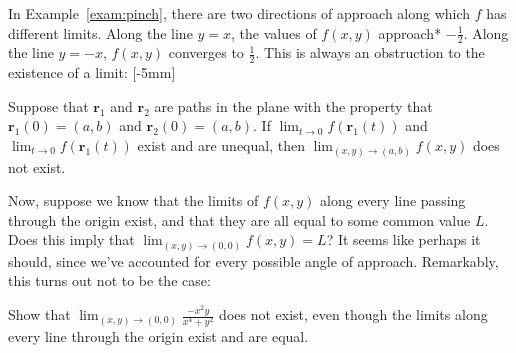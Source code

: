 \documentclass[svgnames]{report}
\begin{document}
In Example~\ref{exam:pinch}, there are two directions of approach
along which $f$ has different limits. Along the line $y = x$, the
values of $f(x,y)$ approach* $-\tfrac{1}{2}$. Along the line $y = -x$,
$f(x,y)$ converges to $\tfrac{1}{2}$. This is always an obstruction to
the existence of a limit: [-5mm]

\begin{exercise}{}{}
  Suppose that $\mathbf{r}_1$ and $\mathbf{r}_2$ are paths in the
  plane with the property that $\mathbf{r}_1(0) = (a,b)$ and
  $\mathbf{r}_2(0) = (a,b)$. If $\lim_{t \to 0}f(\mathbf{r}_1(t))$ and
  $\lim_{t \to 0}f(\mathbf{r}_1(t))$ exist and are unequal, then
  $\displaystyle{\lim_{(x,y) \to (a,b)} f(x,y)}$ does not exist. 
\end{exercise}

Now, suppose we know that the limits of $f(x,y)$ along every line
passing through the origin exist, and that they are all equal to some
common value $L$. Does
this imply that $\lim_{(x,y) \to (0,0)}f(x,y) = L$? It seems like
perhaps it should, since we've accounted for every possible angle of
approach. Remarkably, this turns out not to be the case:

\begin{example}{}{}
  Show that $\lim_{(x,y) \to (0,0)}\frac{-x^2 y }{x^4 + y^2}$ does not
  exist, even though the limits along every line through the origin
  exist and are equal. 
\end{example}
\end{document}
